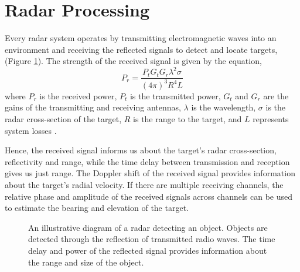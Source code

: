 \section{Radar Processing}
\label{sec:background-radar-processing}
Every radar system operates by transmitting electromagnetic waves into an environment and 
receiving the reflected signals to detect and locate targets, (Figure \ref{fig:radar_operation}). 
The strength of the received signal is given by the equation,
\begin{equation}
P_r = \frac{P_t G_t G_r \lambda^2 \sigma}{(4\pi)^3 R^4 L}
\end{equation}
where $P_r$ is the received power, $P_t$ is the transmitted power, $G_t$ and $G_r$ are the gains
of the transmitting and receiving antennas, $\lambda$ is the wavelength, $\sigma$ is the radar
cross-section of the target, $R$ is the range to the target, and $L$ represents system losses \cite{Skolnik2001IntroRadarSystems}.

Hence, the received signal informs us about the target's radar cross-section, reflectivity and 
range, while the time delay between transmission and reception gives us just range. The 
Doppler shift of the received signal provides information about the target's radial 
velocity. If there are multiple receiving channels, the relative phase and amplitude of 
the received signals across channels can be used to estimate the bearing and elevation of 
the target.  

\begin{figure}[htb]
    \label{fig:radar_operation}
    \caption[Radar illustration]{An illustrative diagram of a radar detecting an object. Objects 
    are detected through the reflection of transmitted radio waves. The time delay and power of 
    the reflected signal provides information about the range and size of the object.}
\end{figure}


